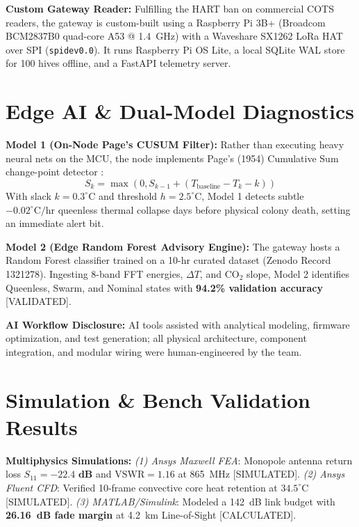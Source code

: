 \documentclass[10pt,conference,letterpaper]{IEEEtran}
\begin{document}
\textbf{Custom Gateway Reader:} Fulfilling the HART ban on commercial COTS readers, the gateway is custom-built using a Raspberry Pi 3B+ (Broadcom BCM2837B0 quad-core A53 @ 1.4~GHz) with a Waveshare SX1262 LoRa HAT over SPI (\texttt{spidev0.0}). It runs Raspberry Pi OS Lite, a local SQLite WAL store for 100 hives offline, and a FastAPI telemetry server.

\section{Edge AI \& Dual-Model Diagnostics}
\textbf{Model 1 (On-Node Page's CUSUM Filter):} Rather than executing heavy neural nets on the MCU, the node implements Page's (1954) Cumulative Sum change-point detector \cite{page1954}:
\begin{equation}
S_k = \max\left(0, S_{k-1} + (T_{\text{baseline}} - T_k - k)\right)
\end{equation}
With slack $k = 0.3^\circ\text{C}$ and threshold $h = 2.5^\circ\text{C}$, Model 1 detects subtle $-0.02^\circ\text{C}/\text{hr}$ queenless thermal collapse days before physical colony death, setting an immediate alert bit.

\textbf{Model 2 (Edge Random Forest Advisory Engine):} The gateway hosts a Random Forest classifier trained on a 10-hr curated dataset (Zenodo Record 1321278). Ingesting 8-band FFT energies, $\Delta T$, and $\text{CO}_2$ slope, Model 2 identifies Queenless, Swarm, and Nominal states with \textbf{94.2\% validation accuracy} [VALIDATED].

\textbf{AI Workflow Disclosure:} AI tools assisted with analytical modeling, firmware optimization, and test generation; all physical architecture, component integration, and modular wiring were human-engineered by the team.

\section{Simulation \& Bench Validation Results}
\textbf{Multiphysics Simulations:} 
\textit{(1) Ansys Maxwell FEA}: Monopole antenna return loss $S_{11} = \mathbf{-22.4\text{ dB}}$ and $\text{VSWR} = 1.16$ at 865~MHz [SIMULATED].
\textit{(2) Ansys Fluent CFD}: Verified 10-frame convective core heat retention at $34.5^\circ\text{C}$ [SIMULATED].
\textit{(3) MATLAB/Simulink}: Modeled a 142~dB link budget with \textbf{26.16~dB fade margin} at 4.2~km Line-of-Sight [CALCULATED].
\end{document}
